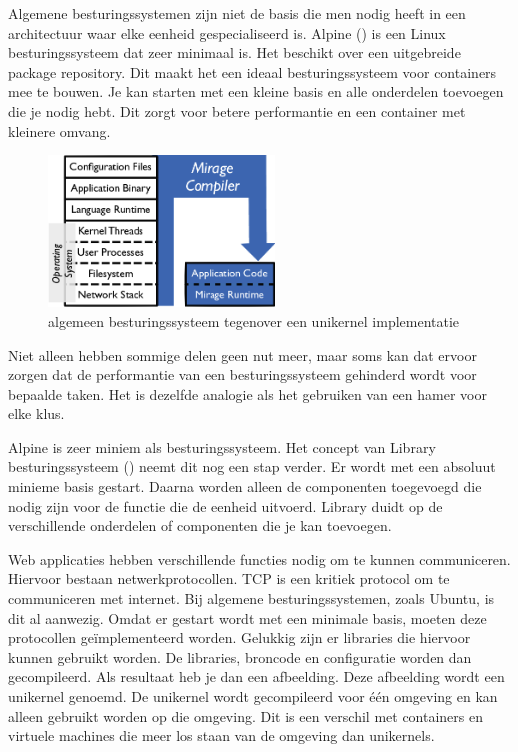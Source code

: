 \documentclass[pdftex,a4paper,12pt,twoside]{report}
\begin{document}
Algemene besturingssystemen zijn niet de basis die men nodig heeft in een architectuur waar elke eenheid gespecialiseerd is. Alpine (\cite{alpine_linux_development_team_alpine_????}) is een Linux besturingssysteem dat zeer minimaal is. Het beschikt over een uitgebreide package repository. Dit maakt het een ideaal besturingssysteem voor containers mee te bouwen. Je kan starten met een kleine basis en alle onderdelen toevoegen die je nodig hebt. Dit zorgt voor betere performantie en een container met kleinere omvang.

\begin{figure}
    \centering
    \includegraphics[width=6cm]{img/unikernel}
    \caption{algemeen besturingssysteem tegenover een unikernel implementatie \cite{madhavapeddy_unikernels_2013}}
    \label{fig:unikernel}
\end{figure}

Niet alleen hebben sommige delen geen nut meer, maar soms kan dat ervoor zorgen dat de performantie van een besturingssysteem gehinderd wordt voor bepaalde taken. Het is dezelfde analogie als het gebruiken van een hamer voor elke klus.

Alpine is zeer miniem als besturingssysteem. Het concept van Library besturingssysteem (\cite{madhavapeddy_unikernels_2013}) neemt dit nog een stap verder. Er wordt met een absoluut minieme basis gestart. Daarna worden alleen de componenten toegevoegd die nodig zijn voor de functie die de eenheid uitvoerd. Library duidt op de verschillende onderdelen of componenten die je kan toevoegen.

Web applicaties hebben verschillende functies nodig om te kunnen communiceren. Hiervoor bestaan netwerkprotocollen. TCP is een kritiek protocol om te communiceren met internet. Bij algemene besturingssystemen, zoals Ubuntu, is dit al aanwezig. Omdat er gestart wordt met een minimale basis, moeten deze protocollen geïmplementeerd worden. Gelukkig zijn er libraries die hiervoor kunnen gebruikt worden. De libraries, broncode en configuratie worden dan gecompileerd. Als resultaat heb je dan een afbeelding. Deze afbeelding wordt een unikernel genoemd. De unikernel wordt gecompileerd voor één omgeving en kan alleen gebruikt worden op die omgeving. Dit is een verschil met containers en virtuele machines die meer los staan van de omgeving dan unikernels.
\end{document}
